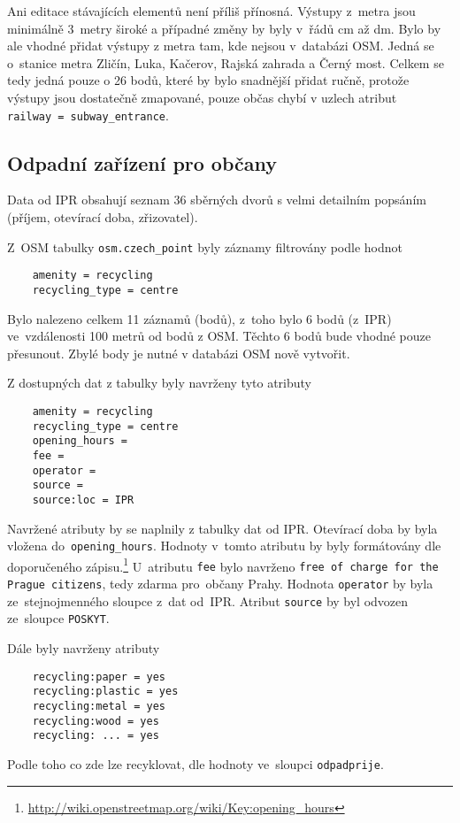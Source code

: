 Ani editace stávajících elementů není příliš přínosná. Výstupy
z~metra jsou minimálně 3~metry široké a případné změny by byly v~řádů
cm až dm. Bylo by ale vhodné přidat výstupy z metra tam, kde nejsou
v~databázi OSM. Jedná se o~stanice metra Zličín, Luka, Kačerov, Rajská
zahrada a Černý most. Celkem se tedy jedná pouze o 26 bodů, které by
bylo snadnější přidat ručně, protože výstupy jsou dostatečně zmapované,
pouze občas chybí v uzlech atribut {\tt railway~=~subway\_entrance}.


\subsection{Odpadní zařízení pro občany}
\label{Odpadní zařízení pro občany}
Data od IPR obsahují seznam 36 sběrných dvorů s velmi detailním
popsáním (příjem, otevírací doba, zřizovatel). 

Z~OSM tabulky {\tt osm.czech\_point} byly záznamy filtrovány podle
hodnot
\begin{verbatim}
    amenity = recycling
    recycling_type = centre
\end{verbatim}    
Bylo nalezeno celkem 11 záznamů (bodů), z~toho bylo 6 bodů (z~IPR)
ve~vzdálenosti 100 metrů od bodů z OSM. Těchto 6 bodů bude vhodné
pouze přesunout. Zbylé body je nutné v databázi OSM nově vytvořit.

Z dostupných dat z tabulky byly navrženy tyto atributy
\begin{verbatim}
    amenity = recycling
    recycling_type = centre
    opening_hours =
    fee =
    operator =
    source =
    source:loc = IPR
\end{verbatim}
Navržené atributy by se naplnily z tabulky dat od IPR. Otevírací doba
by byla vložena do~{\tt opening\_hours}. Hodnoty v~tomto atributu
by byly formátovány dle doporučeného zápisu.\footnote{\url{http://wiki.openstreetmap.org/wiki/Key:opening\_hours}}
U~atributu {\tt fee} bylo navrženo {\tt free of charge for the Prague citizens}, tedy zdarma pro~občany Prahy. Hodnota
{\tt operator} by byla ze~stejnojmenného sloupce z~dat od~IPR. 
Atribut {\tt source} by byl odvozen ze~sloupce {\tt POSKYT}.

Dále byly navrženy atributy
\begin{verbatim}
    recycling:paper = yes
    recycling:plastic = yes
    recycling:metal = yes
    recycling:wood = yes
    recycling: ... = yes
\end{verbatim}
Podle toho co zde lze recyklovat, dle hodnoty ve~sloupci {\tt odpadprije}.


